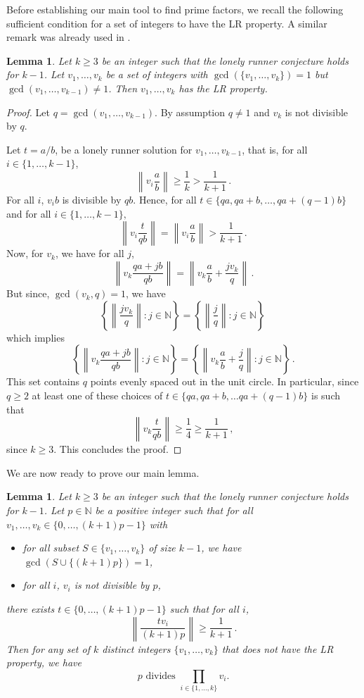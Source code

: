 \documentclass[11pt,a4paper]{article}
\newtheorem{lemma}[theorem]{Lemma}
\theoremstyle{definition}
\theoremstyle{remark}
\begin{document}
Before establishing our main tool to find prime factors, we recall the following sufficient condition for a set of integers to have the LR property. 
A similar remark was already used in \cite{Bienia1998Jan}.
\begin{lemma}\label{StrongerGCDCondition}
Let $k \geq 3$ be an integer such that the lonely runner conjecture holds for $k-1$. Let $v_1, \ldots, v_k$ be a set of integers with $\gcd(\{v_1, \ldots, v_k\})=1$ but $\gcd(v_1,\ldots, v_{k-1})\not=1$. Then $v_1, \ldots, v_k$ has the LR property.
\end{lemma}
\begin{proof}
Let $q=\gcd(v_1,\ldots, v_{k-1})$. By assumption $q\not=1$ and $v_k$ is not divisible by $q$.

Let $t=a/b$, be a lonely runner solution for $v_1,\ldots,v_{k-1}$, that is, for all $i\in \{1,\ldots, k-1\}$, 
\[
\left\|v_i\frac{a}{b}\right\|\ge \frac{1}{k}>\frac{1}{k+1}\,.
\]
For all $i$, $v_ib$ is divisible by $qb$. Hence, for all $t\in \{qa, qa+b,\ldots, qa+(q-1)b\}$ and for all $i\in \{1,\ldots, k-1\},$
\[
\left\|v_i\frac{t}{qb}\right\|=\left\|v_i\frac{a}{b}\right\|>\frac{1}{k+1}\,.
\]
Now, for $v_k$, we have for all $j$,
\[
\left\|v_k\frac{qa+jb}{qb}\right\|
=\left\|v_k\frac{a}{b} + \frac{jv_k}{q}\right\|\,.
\]
But since, $\gcd(v_k,q)=1$, we have 
\[
\left\{\left\|\frac{jv_k}{q}\right\|: j\in\mathbb{N}\right\}=  \left\{\left\|\frac{j}{q}\right\|: j\in\mathbb{N}\right\}\,
\]
which implies
\[
\left\{\left\|v_k\frac{qa+jb}{qb}\right\|: j\in\mathbb{N}\right\}
=\left\{\left\|v_k\frac{a}{b} + \frac{j}{q}\right\|: j\in\mathbb{N}\right\}\,.
\]
This set contains $q$ points evenly spaced out in the unit circle. In particular, since $q\ge2$ 
at least one of these choices of $t\in \{qa, qa+b,\ldots qa+(q-1)b\}$ is such that
\[
\left\|v_k\frac{t}{qb}\right\|\ge\frac{1}{4}\ge\frac{1}{k+1}\,,
\]
since $k\ge3$. This concludes the proof.
\end{proof}
We are now ready to prove our main lemma.
\begin{lemma}\label{lem:needOfCovering}
Let $k\ge3$ be an integer such that the lonely runner conjecture holds for $k-1$. Let $p\in \mathbb{N}$ be a positive integer such that for all 
$v_1,\ldots, v_k\in \{0,\ldots, (k+1)p-1\}$ with
\begin{itemize}
\item for all subset $S\in \{v_1,\ldots, v_k\}$ of size $k-1$, we have $\gcd(S\cup\{(k+1)p\})=1$,
\item for all $i$, $v_i$ is not divisible by $p$,
\end{itemize} 
there exists $t\in \{0,\ldots,(k+1)p-1\}$ such that for all $i$,
\[
\left\|\frac{tv_i}{(k+1)p}\right\|\ge \frac{1}{k+1}\,.
\]
Then for any set of $k$ distinct integers $\{v_1, \ldots, v_k\}$ that does not have the LR property, we have 
  \[
 p \text{ divides } \prod_{i\in \{1,\ldots, k\}}v_i.
  \]
\end{lemma}
\end{document}
